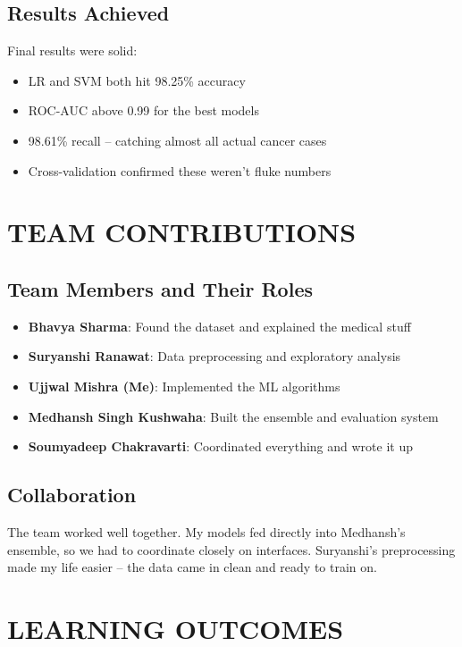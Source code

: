 \documentclass[12pt]{article}
\begin{document}
\subsection{Results Achieved}
Final results were solid:
\begin{itemize}
    \item LR and SVM both hit 98.25\% accuracy
    \item ROC-AUC above 0.99 for the best models
    \item 98.61\% recall -- catching almost all actual cancer cases
    \item Cross-validation confirmed these weren't fluke numbers
\end{itemize}

\newpage
\section{TEAM CONTRIBUTIONS}

\subsection{Team Members and Their Roles}

\begin{itemize}
    \item \textbf{Bhavya Sharma}: Found the dataset and explained the medical stuff
    \item \textbf{Suryanshi Ranawat}: Data preprocessing and exploratory analysis
    \item \textbf{Ujjwal Mishra (Me)}: Implemented the ML algorithms
    \item \textbf{Medhansh Singh Kushwaha}: Built the ensemble and evaluation system
    \item \textbf{Soumyadeep Chakravarti}: Coordinated everything and wrote it up
\end{itemize}

\subsection{Collaboration}
The team worked well together. My models fed directly into Medhansh's ensemble, so we had to coordinate closely on interfaces. Suryanshi's preprocessing made my life easier -- the data came in clean and ready to train on.

\newpage
\section{LEARNING OUTCOMES}
\end{document}
